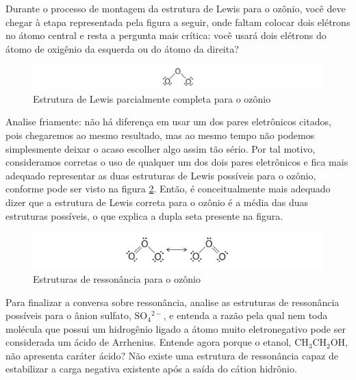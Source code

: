 \documentclass[a4paper,12pt]{book}
\begin{document}
Durante o processo de montagem da estrutura de Lewis para o ozônio, você deve chegar à etapa representada pela figura a seguir, onde faltam colocar dois elétrons no átomo central e resta a pergunta mais crítica: você usará dois elétrons do átomo de oxigênio da esquerda ou do átomo da direita?

\begin{figure}[h]
	\centering
	\caption{Estrutura de Lewis parcialmente completa para o ozônio}
	\vspace{0.5cm}
	\label{fig:lewis}
	\includegraphics[width=1\linewidth]{imagens/o3parcial.jpg}
\end{figure}

Analise friamente: não há diferença em usar um dos pares eletrônicos citados, pois chegaremos ao mesmo resultado, mas ao mesmo tempo não podemos simplesmente deixar o acaso escolher algo assim tão sério. Por tal motivo, consideramos corretas o uso de qualquer um dos dois pares eletrônicos e fica mais adequado representar as duas estruturas de Lewis possíveis para o ozônio, conforme pode ser visto na figura \ref*{fig:ozonio}. Então, é conceitualmente mais adequado dizer que a estrutura de Lewis correta para o ozônio é a média das duas estruturas possíveis, o que explica a dupla seta presente na figura.

\begin{figure}[h]
	\centering
	\caption{Estruturas de ressonância para o ozônio}
	\vspace{0.5cm}
	\label{fig:ozonio}
	\includegraphics[width=1\linewidth]{imagens/o3completo.jpeg}
\end{figure}

Para finalizar a conversa sobre ressonância, analise as estruturas de ressonância possíveis para o ânion sulfato, SO{$_4$}{$^{2-}$}, e entenda a razão pela qual nem toda molécula que possui um hidrogênio ligado a átomo muito eletronegativo pode ser considerada um ácido de Arrhenius. Entende agora porque o etanol, CH{$_3$}CH{$_2$}OH, não apresenta caráter ácido? Não existe uma estrutura de ressonância capaz de estabilizar a carga negativa existente após a saída do cátion hidrônio.
\end{document}
